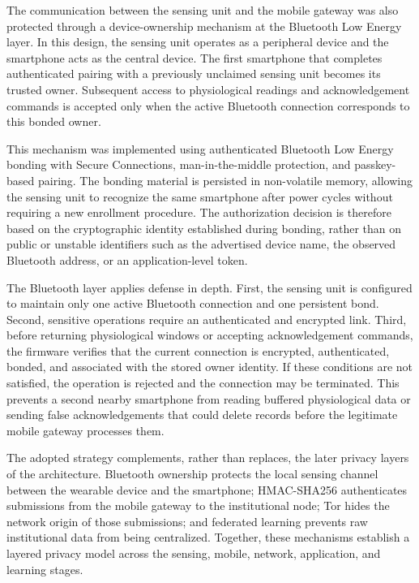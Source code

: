 \documentclass[12pt]{article}
\begin{document}
The communication between the sensing unit and the mobile gateway was also protected through a device-ownership mechanism at the Bluetooth Low Energy layer. In this design, the sensing unit operates as a peripheral device and the smartphone acts as the central device. The first smartphone that completes authenticated pairing with a previously unclaimed sensing unit becomes its trusted owner. Subsequent access to physiological readings and acknowledgement commands is accepted only when the active Bluetooth connection corresponds to this bonded owner.

This mechanism was implemented using authenticated Bluetooth Low Energy bonding with Secure Connections, man-in-the-middle protection, and passkey-based pairing. The bonding material is persisted in non-volatile memory, allowing the sensing unit to recognize the same smartphone after power cycles without requiring a new enrollment procedure. The authorization decision is therefore based on the cryptographic identity established during bonding, rather than on public or unstable identifiers such as the advertised device name, the observed Bluetooth address, or an application-level token.

The Bluetooth layer applies defense in depth. First, the sensing unit is configured to maintain only one active Bluetooth connection and one persistent bond. Second, sensitive operations require an authenticated and encrypted link. Third, before returning physiological windows or accepting acknowledgement commands, the firmware verifies that the current connection is encrypted, authenticated, bonded, and associated with the stored owner identity. If these conditions are not satisfied, the operation is rejected and the connection may be terminated. This prevents a second nearby smartphone from reading buffered physiological data or sending false acknowledgements that could delete records before the legitimate mobile gateway processes them.

The adopted strategy complements, rather than replaces, the later privacy layers of the architecture. Bluetooth ownership protects the local sensing channel between the wearable device and the smartphone; HMAC-SHA256 authenticates submissions from the mobile gateway to the institutional node; Tor hides the network origin of those submissions; and federated learning prevents raw institutional data from being centralized. Together, these mechanisms establish a layered privacy model across the sensing, mobile, network, application, and learning stages.
\end{document}
